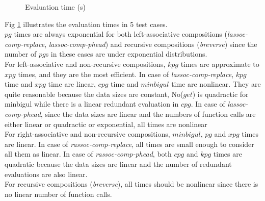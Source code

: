 \documentclass[runningheads]{llncs}
\begin{document}
\begin{figure}
{
    }
    \caption{Evaluation time (s)}
    \label{fig:evaluation-time}
\end{figure}

Fig \ref{fig:evaluation-time} illustrates the evaluation times in 5 test cases.\\

$pg$ times are always exponential for both left-associative compositions (\textit{lassoc-comp-replace}, \textit{lassoc-comp-phead}) and recursive compositions (\textit{breverse}) since the number of $pg$s in these cases are under exponential distributions.\\

For left-associative and non-recursive compositions, $kpg$ times are approximate to $xpg$ times, and they are the most efficient. In case of \textit{lassoc-comp-replace}, $kpg$ time and $xpg$ time are linear, $cpg$ time and $minbigul$ time are nonlinear. They are quite reasonable because the data sizes are constant, No($get$) is quadractic for minbigul while there is a linear redundant evaluation in $cpg$. In case of \textit{lassoc-comp-phead}, since the data sizes are linear and the numbers of function calls are either linear or quadractic or exponential, all times are nonlinear\\

For right-associative and non-recursive compositions, $minbigul$, $pg$ and $xpg$ times are linear. In case of \textit{rassoc-comp-replace}, all times are small enough to consider all them as linear. In case of \textit{rassoc-comp-phead}, both $cpg$ and $kpg$ times are quadratic because the data sizes are linear and the number of redundant evaluations are also linear.\\

For recursive compositions (\textit{breverse}), all times should be nonlinear since there is no linear number of function calls.\\
\end{document}
